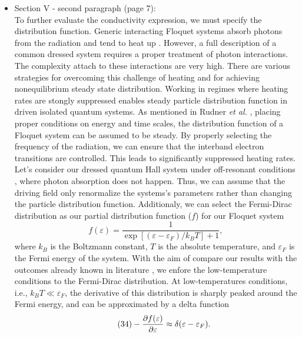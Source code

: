 \documentclass{article}
\begin{document}
\begin{itemize}
  \item Section V - second paragraph (page 7):\\
  {\color{Red}
  To further evaluate the conductivity expression, we must specify the distribution function. Generic interacting Floquet systems absorb photons from the radiation and tend to heat up \cite{seetharam2019,rudner2020}.
  However, a full description of a common dressed system requires a proper treatment of photon interactions. The complexity attach to these interactions are very high. There are various strategies \cite{lindner2017,bukov2015,eckardt2015,kuwahara2016,abanin2017,mori2018,rudner2020} for overcoming this challenge of heating and for achieving nonequilibrium steady state distribution. Working in regimes where heating rates are stongly suppressed enables steady particle distribution function in driven isolated quantum systems.
  As mentioned in Rudner \textit{et al.} \cite{rudner2020}, placing proper conditions on energy and time scales, the distribution function of a Floquet system can be assumed to be steady. By properly selecting the frequency of the radiation, we can ensure that the interband electron transitions are controlled. This leads to significantly suppressed heating rates.
  Let's consider our dressed quantum Hall system under off-resonant conditions \cite{rudner2020,wackerlthesis20}, where photon absorption does not happen. Thus, we can assume that the driving field only renormalize the systems's parameters rather than changing the particle distribution function.
  Additionaly, we can select the Fermi-Dirac distribution as our partial distribution function ($f$) for our Floquet system
  \begin{equation} \tag{33}
    f(\varepsilon) = \frac{1}{\exp[(\varepsilon - \varepsilon_F)/k_B T]+1},
  \end{equation}
  where $k_B$ is the Boltzmann constant, $T$ is the absolute temperature, and $\varepsilon_F$ is the Fermi energy of the system. With the aim of compare our results with the outcomes already known in literature \cite{dini16,endo09}, we enfore the low-temperature conditions to the Fermi-Dirac distribution.
  At low-temperatures conditions, i.e., $k_BT \ll \varepsilon_F$, the derivative of this distribution is sharply peaked around the Fermi energy, and can be approximated by a delta function \cite{endo09}
  \begin{equation} \tag{34}
    - \pdv{f(\varepsilon)}{\varepsilon} \approx \delta(\varepsilon - \varepsilon_F).
  \end{equation}
  }
\end{itemize}
\end{document}
